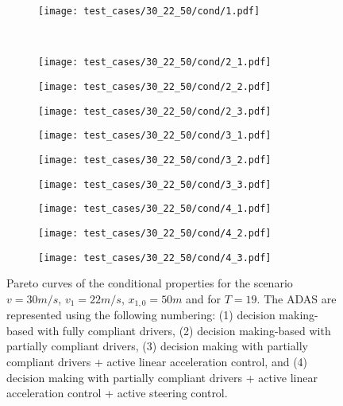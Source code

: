 \begin{figure}[H]
\centering
\begin{subfigure}{0.32\textwidth}
  \centering
  \texttt{[image: test\_cases/30\_22\_50/cond/1.pdf]}
\end{subfigure}\\
\begin{subfigure}{0.32\textwidth}
  \centering
  \texttt{[image: test\_cases/30\_22\_50/cond/2\_1.pdf]}
\end{subfigure} 
\begin{subfigure}{0.32\textwidth}
  \centering
  \texttt{[image: test\_cases/30\_22\_50/cond/2\_2.pdf]}
\end{subfigure}
\begin{subfigure}{0.32\textwidth}
  \centering
  \texttt{[image: test\_cases/30\_22\_50/cond/2\_3.pdf]}
\end{subfigure}
\begin{subfigure}{0.32\textwidth}
  \centering
  \texttt{[image: test\_cases/30\_22\_50/cond/3\_1.pdf]}
\end{subfigure}
\begin{subfigure}{0.32\textwidth}
  \centering
  \texttt{[image: test\_cases/30\_22\_50/cond/3\_2.pdf]}
\end{subfigure}
\begin{subfigure}{0.32\textwidth}
  \centering
  \texttt{[image: test\_cases/30\_22\_50/cond/3\_3.pdf]}
\end{subfigure}
\begin{subfigure}{0.32\textwidth}
  \centering
  \texttt{[image: test\_cases/30\_22\_50/cond/4\_1.pdf]}
\end{subfigure} 
\begin{subfigure}{0.32\textwidth}
  \centering
  \texttt{[image: test\_cases/30\_22\_50/cond/4\_2.pdf]}
\end{subfigure}
\begin{subfigure}{0.32\textwidth}
  \centering
  \texttt{[image: test\_cases/30\_22\_50/cond/4\_3.pdf]}
\end{subfigure}
\caption{Pareto curves of the conditional properties for the scenario $v = 30m/s$, $v_1 = 22m/s$, $x_{1,0} = 50m$ and for $T = 19$. The ADAS are represented using the following numbering: (1) decision making-based with fully compliant drivers, (2) decision making-based with partially compliant drivers, (3) decision making with partially compliant drivers + active linear acceleration control, and (4) decision making with partially compliant drivers + active linear acceleration control + active steering control.}
\label{fig:test_case_2_cond}
\end{figure}

